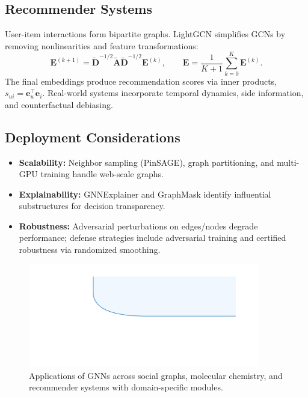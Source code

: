 \documentclass{article}
\begin{document}
\subsection{Recommender Systems}
User-item interactions form bipartite graphs. LightGCN simplifies GCNs by removing nonlinearities and feature transformations:
\begin{equation}
  \mathbf{E}^{(k+1)} = \tilde{\mathbf{D}}^{-1/2} \tilde{\mathbf{A}} \tilde{\mathbf{D}}^{-1/2} \mathbf{E}^{(k)}, \qquad \mathbf{E} = \frac{1}{K+1} \sum_{k=0}^{K} \mathbf{E}^{(k)}.
\end{equation}
The final embeddings produce recommendation scores via inner products, $s_{ui} = \mathbf{e}_u^\top \mathbf{e}_i$. Real-world systems incorporate temporal dynamics, side information, and counterfactual debiasing.

\subsection{Deployment Considerations}
\begin{itemize}
  \item \textbf{Scalability:} Neighbor sampling (PinSAGE), graph partitioning, and multi-GPU training handle web-scale graphs.
  \item \textbf{Explainability:} GNNExplainer and GraphMask identify influential substructures for decision transparency.
  \item \textbf{Robustness:} Adversarial perturbations on edges/nodes degrade performance; defense strategies include adversarial training and certified robustness via randomized smoothing.
\end{itemize}

\begin{figure}[H]
  \centering
  \includegraphics[width=0.9\textwidth]{gnn_application_landscape.png}
  \caption{Applications of GNNs across social graphs, molecular chemistry, and recommender systems with domain-specific modules.}
  \label{fig:gnn_application_landscape}
\end{figure}
\FloatBarrier
\end{document}
